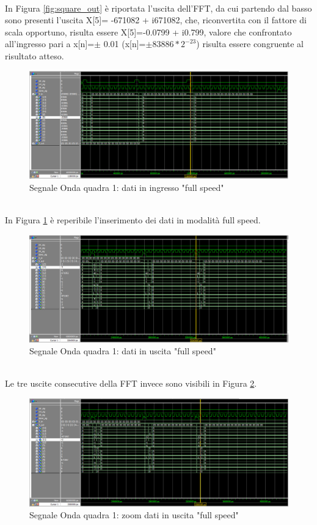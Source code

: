 \documentclass[a4paper, titlepage]{article}
\begin{document}
\\In Figura \ref{fig:square_out} è riportata l'uscita dell'FFT, da cui partendo dal basso sono presenti l'uscita X[5]= -671082 + i671082, che, riconvertita con il fattore di scala opportuno, risulta essere X[5]=-0.0799 + i0.799, valore che confrontato all'ingresso pari a x[n]=$\pm$ 0.01 (x[n]=$\pm83886*2^{-23}$) risulta essere congruente al risultato atteso.
\begin{figure}[h]
    \centering
    \includegraphics[scale=0.45]{test_square1/fs_square_in_doble.png}
    \caption{Segnale Onda quadra 1: dati in ingresso "full speed"}
    \label{fig:square_in_doble}
\end{figure}\\
In Figura \ref{fig:square_in_doble} è reperibile l'inserimento dei dati in modalità full speed.
\pagebreak
\begin{figure}[h]
    \centering
    \includegraphics[scale=0.45]{test_square1/fs_square_out_doble.png}
    \caption{Segnale Onda quadra 1: dati in uscita "full speed"}
    \label{fig:square_out_doble}
\end{figure}\\
Le tre uscite consecutive della FFT invece sono visibili in Figura \ref{fig:square_out_doble}.
\begin{figure}[h]
    \centering
    \includegraphics[scale=0.45]{test_square1/zoom_2nd_out.png}
    \caption{Segnale Onda quadra 1: zoom dati in uscita "full speed"}
    \label{fig:square_out_zoom}
\end{figure}\\
\end{document}
